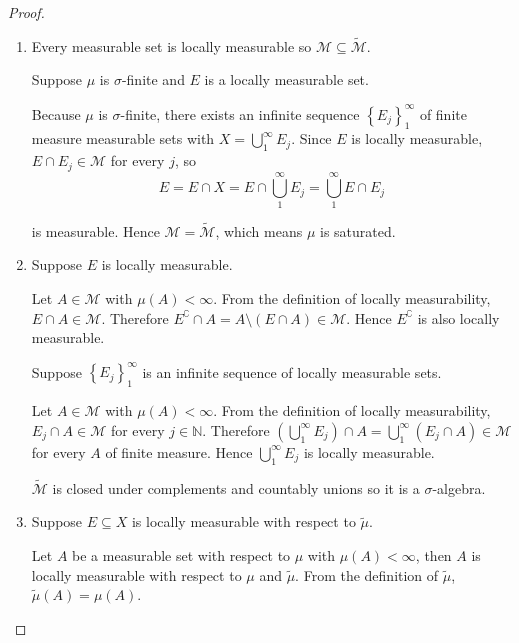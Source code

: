 \begin{proof}
    \begin{enumerate}[itemsep=0pt,label=\textbf{\alph*.}]
        \item Every measurable set is locally measurable so \( \mathcal{M} \subseteq \widetilde{\mathcal{M}} \).

              Suppose \( \mu \) is \( \sigma \)-finite and \( E \) is a locally measurable set.

              Because \( \mu \) is \( \sigma \)-finite, there exists an infinite sequence \( {\left\{ E_{j} \right\}}_{1}^{\infty} \) of finite measure measurable sets with \( X = \bigcup_{1}^{\infty} E_{j} \). Since \( E \) is locally measurable, \( E \cap E_{j} \in \mathcal{M} \) for every \( j \), so
              \[
                  E = E \cap X = E \cap \bigcup_{1}^{\infty} E_{j} = \bigcup_{1}^{\infty} E \cap E_{j}
              \]

              is measurable. Hence \( \mathcal{M} = \widetilde{\mathcal{M}} \), which means \( \mu \) is saturated.
        \item Suppose \( E \) is locally measurable.

              Let \( A \in \mathcal{M} \) with \( \mu(A) < \infty \). From the definition of locally measurability, \( E \cap A \in \mathcal{M} \). Therefore \( E^{\complement} \cap A = A \setminus (E \cap A) \in \mathcal{M} \). Hence \( E^{\complement} \) is also locally measurable.

              Suppose \( {\left\{ E_{j} \right\}}_{1}^{\infty} \) is an infinite sequence of locally measurable sets.

              Let \( A \in \mathcal{M} \) with \( \mu(A) < \infty \). From the definition of locally measurability, \( E_{j} \cap A \in \mathcal{M} \) for every \( j \in \mathbb{N} \). Therefore \( \left(\bigcup_{1}^{\infty} E_{j}\right) \cap A = \bigcup_{1}^{\infty} (E_{j} \cap A) \in \mathcal{M} \) for every \( A \) of finite measure. Hence \( \bigcup_{1}^{\infty} E_{j} \) is locally measurable.

              \( \widetilde{\mathcal{M}} \) is closed under complements and countably unions so it is a \( \sigma \)-algebra.
        \item Suppose \( E \subseteq X \) is locally measurable with respect to \( \widetilde{\mu} \).

              Let \( A \) be a measurable set with respect to \( \mu \) with \( \mu(A) < \infty \), then \( A \) is locally measurable with respect to \( \mu \) and \( \widetilde{\mu} \). From the definition of \( \widetilde{\mu} \), \( \widetilde{\mu}(A) = \mu(A) \).


\end{enumerate}
\end{proof}
